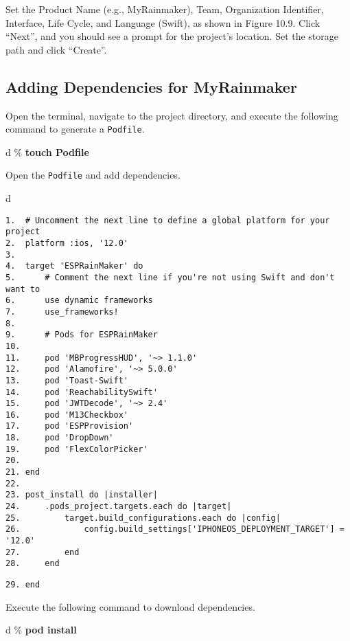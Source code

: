 \documentclass[a4paper,12pt]{book}
\begin{document}
Set the Product Name (e.g., MyRainmaker), Team, Organization Identifier, Interface, Life Cycle, and Language (Swift), as shown in Figure 10.9. Click “Next”, and you should see a prompt for the project’s location. Set the storage path and click “Create”.

\subsection{Adding Dependencies for MyRainmaker}
Open the terminal, navigate to the project directory, and execute the following command to generate a \verb|Podfile|.

\begin{codebloc}
\begin{tabular}{d}
\% \textbf{touch Podfile}
\end{tabular}
\end{codebloc}

Open the \verb|Podfile| and add dependencies.

\begin{codebloc}
\begin{tabular}{d}
\vspace{2pt}
\begin{verbatim}
1.  # Uncomment the next line to define a global platform for your project
2.  platform :ios, '12.0'
3.
4.  target 'ESPRainMaker' do
5.      # Comment the next line if you're not using Swift and don't want to
6.      use dynamic frameworks
7.      use_frameworks!
8.
9.      # Pods for ESPRainMaker
10.
11.     pod 'MBProgressHUD', '~> 1.1.0'
12.     pod 'Alamofire', '~> 5.0.0'
13.     pod 'Toast-Swift'
14.     pod 'ReachabilitySwift'
15.     pod 'JWTDecode', '~> 2.4'
16.     pod 'M13Checkbox'
17.     pod 'ESPProvision'
18.     pod 'DropDown'
19.     pod 'FlexColorPicker'
20.
21. end
22.
23. post_install do |installer|
24.     .pods_project.targets.each do |target|
25.         target.build_configurations.each do |config|
26.             config.build_settings['IPHONEOS_DEPLOYMENT_TARGET'] = '12.0'
27.         end
28.     end
\end{verbatim}
\verb|29. end|
\end{tabular}
\end{codebloc}

Execute the following command to download dependencies.

\begin{codebloc}
\begin{tabular}{d}
\% \textbf{pod install}
\end{tabular}
\end{codebloc}
\end{document}
